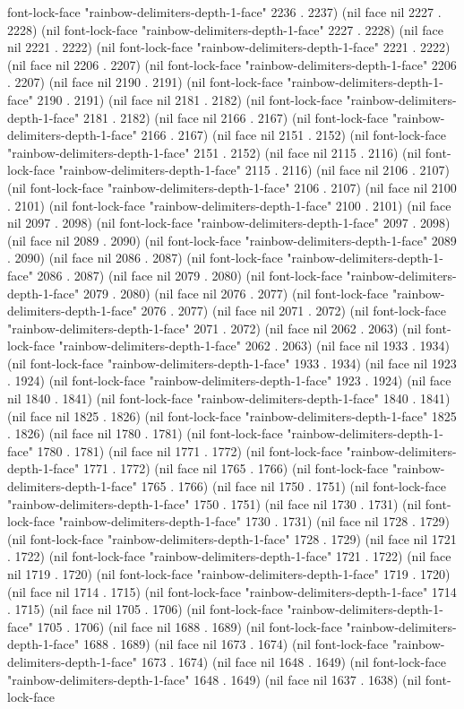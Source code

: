 font-lock-face "rainbow-delimiters-depth-1-face" 2236 . 2237) (nil face nil 2227 . 2228) (nil font-lock-face "rainbow-delimiters-depth-1-face" 2227 . 2228) (nil face nil 2221 . 2222) (nil font-lock-face "rainbow-delimiters-depth-1-face" 2221 . 2222) (nil face nil 2206 . 2207) (nil font-lock-face "rainbow-delimiters-depth-1-face" 2206 . 2207) (nil face nil 2190 . 2191) (nil font-lock-face "rainbow-delimiters-depth-1-face" 2190 . 2191) (nil face nil 2181 . 2182) (nil font-lock-face "rainbow-delimiters-depth-1-face" 2181 . 2182) (nil face nil 2166 . 2167) (nil font-lock-face "rainbow-delimiters-depth-1-face" 2166 . 2167) (nil face nil 2151 . 2152) (nil font-lock-face "rainbow-delimiters-depth-1-face" 2151 . 2152) (nil face nil 2115 . 2116) (nil font-lock-face "rainbow-delimiters-depth-1-face" 2115 . 2116) (nil face nil 2106 . 2107) (nil font-lock-face "rainbow-delimiters-depth-1-face" 2106 . 2107) (nil face nil 2100 . 2101) (nil font-lock-face "rainbow-delimiters-depth-1-face" 2100 . 2101) (nil face nil 2097 . 2098) (nil font-lock-face "rainbow-delimiters-depth-1-face" 2097 . 2098) (nil face nil 2089 . 2090) (nil font-lock-face "rainbow-delimiters-depth-1-face" 2089 . 2090) (nil face nil 2086 . 2087) (nil font-lock-face "rainbow-delimiters-depth-1-face" 2086 . 2087) (nil face nil 2079 . 2080) (nil font-lock-face "rainbow-delimiters-depth-1-face" 2079 . 2080) (nil face nil 2076 . 2077) (nil font-lock-face "rainbow-delimiters-depth-1-face" 2076 . 2077) (nil face nil 2071 . 2072) (nil font-lock-face "rainbow-delimiters-depth-1-face" 2071 . 2072) (nil face nil 2062 . 2063) (nil font-lock-face "rainbow-delimiters-depth-1-face" 2062 . 2063) (nil face nil 1933 . 1934) (nil font-lock-face "rainbow-delimiters-depth-1-face" 1933 . 1934) (nil face nil 1923 . 1924) (nil font-lock-face "rainbow-delimiters-depth-1-face" 1923 . 1924) (nil face nil 1840 . 1841) (nil font-lock-face "rainbow-delimiters-depth-1-face" 1840 . 1841) (nil face nil 1825 . 1826) (nil font-lock-face "rainbow-delimiters-depth-1-face" 1825 . 1826) (nil face nil 1780 . 1781) (nil font-lock-face "rainbow-delimiters-depth-1-face" 1780 . 1781) (nil face nil 1771 . 1772) (nil font-lock-face "rainbow-delimiters-depth-1-face" 1771 . 1772) (nil face nil 1765 . 1766) (nil font-lock-face "rainbow-delimiters-depth-1-face" 1765 . 1766) (nil face nil 1750 . 1751) (nil font-lock-face "rainbow-delimiters-depth-1-face" 1750 . 1751) (nil face nil 1730 . 1731) (nil font-lock-face "rainbow-delimiters-depth-1-face" 1730 . 1731) (nil face nil 1728 . 1729) (nil font-lock-face "rainbow-delimiters-depth-1-face" 1728 . 1729) (nil face nil 1721 . 1722) (nil font-lock-face "rainbow-delimiters-depth-1-face" 1721 . 1722) (nil face nil 1719 . 1720) (nil font-lock-face "rainbow-delimiters-depth-1-face" 1719 . 1720) (nil face nil 1714 . 1715) (nil font-lock-face "rainbow-delimiters-depth-1-face" 1714 . 1715) (nil face nil 1705 . 1706) (nil font-lock-face "rainbow-delimiters-depth-1-face" 1705 . 1706) (nil face nil 1688 . 1689) (nil font-lock-face "rainbow-delimiters-depth-1-face" 1688 . 1689) (nil face nil 1673 . 1674) (nil font-lock-face "rainbow-delimiters-depth-1-face" 1673 . 1674) (nil face nil 1648 . 1649) (nil font-lock-face "rainbow-delimiters-depth-1-face" 1648 . 1649) (nil face nil 1637 . 1638) (nil font-lock-face 